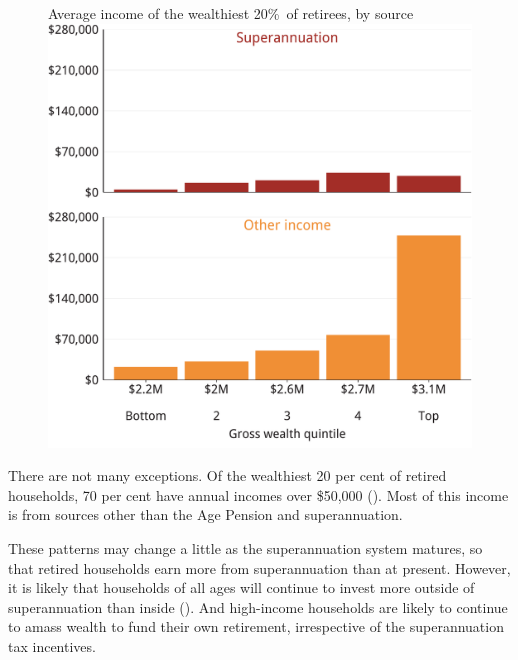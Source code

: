 \begin{figure}[p]
\begin{fullpage}
%
{Average income of the wealthiest 20\%\ of retirees, by source}\label{fig:SUPER-3-4}
\includegraphics[width=\linewidth]{b5-super-atlas/Figure3-4-1.pdf}

\end{fullpage}
\end{figure}

There are not many exceptions. Of the wealthiest 20 per cent of retired households, 70 per cent have annual incomes over \$50,000 (). Most of this income is from sources other than the Age Pension and superannuation. 

These patterns may change a little as the superannuation system matures, so that retired households earn more from superannuation than at present. However, it is likely that households of all ages will continue to invest more outside of superannuation than inside (). And high-income households are likely to continue to amass wealth to fund their own retirement, irrespective of the superannuation tax incentives.

